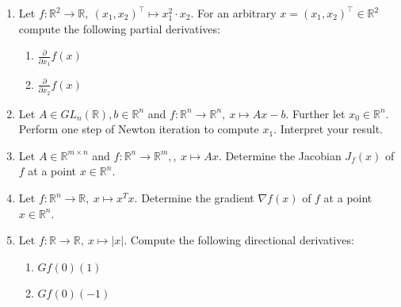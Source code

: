 \begin{enumerate}
		\item Let $f\colon \mathbb{R}^2 \to \mathbb{R},~(x_1,x_2)^\top \mapsto x_1^2 \cdot x_2$. For an arbitrary $x=(x_1,x_2)^\top \in \mathbb{R}^2$ compute the following partial derivatives:
	\begin{enumerate}
		\item $\frac{\partial}{\partial x_1} f(x)$
		\item $\frac{\partial}{\partial x_2} f(x)$
	\end{enumerate}
	\item Let $A\in GL_n(\mathbb{R}), b \in \mathbb{R}^n$ and $f : \mathbb{R}^{n} \to \mathbb{R}^n, ~x \mapsto Ax -b $. Further let $x_0 \in \mathbb{R}^n$. Perform one step of Newton iteration to compute $x_1$. Interpret your result.
	\item Let $A\in \mathbb{R}^{m \times n}$ and $f : \mathbb{R}^{n} \to \mathbb{R}^m,, ~x \mapsto Ax $. Determine the Jacobian $J_f(x)$ of $f$ at a point $x \in\mathbb{R}^{n}$.
	\item Let $f : \mathbb{R}^{n} \to \mathbb{R},~ x \mapsto x^T  x $. Determine the gradient $\nabla f(x)$ of $f$ at a point $x \in\mathbb{R}^{n}$.
	\item Let $f\colon \mathbb{R} \to \mathbb{R},~x\mapsto |x|$. Compute the following directional derivatives:
	\begin{enumerate}
		\item $Gf(0)(1)$
		\item $Gf(0)(-1)$
	\end{enumerate}

\end{enumerate}
 